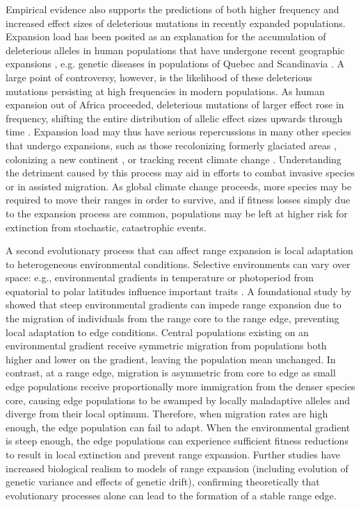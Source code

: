 Empirical evidence also supports the predictions of both higher frequency and increased effect sizes of deleterious mutations in recently expanded populations. Expansion load has been posited as an explanation for the accumulation of deleterious alleles in human populations that have undergone recent geographic expansions \citep{Karlsson:2014}, e.g. genetic diseases in populations of Quebec \citep{Labuda:1997, Scriver:2001, Yotova:2005} and Scandinavia \citep{Norio:2003}. A large point of controversy, however, is the likelihood of these deleterious mutations persisting at high frequencies in modern populations. As human expansion out of Africa proceeded, deleterious mutations of larger effect rose in frequency, shifting the entire distribution of allelic effect sizes upwards through time \citep{Henn:2015}. Expansion load may thus have serious repercussions in many other species that undergo expansions, such as those recolonizing formerly glaciated areas \citep{Hewitt:1999}, colonizing a new continent \citep{Sakai:2001}, or tracking recent climate change \citep{Chen:2011}. Understanding the detriment caused by this process may aid in efforts to combat invasive species or in assisted migration. As global climate change proceeds, more species may be required to move their ranges in order to survive, and if fitness losses simply due to the expansion process are common, populations may be left at higher risk for extinction from stochastic, catastrophic events. 

A second evolutionary process that can affect range expansion is local adaptation to heterogeneous environmental conditions. Selective environments can vary over space: e.g., environmental gradients in temperature or photoperiod from equatorial to polar latitudes influence important traits \citep{Conover:1992, Montague:2008}. A foundational study by \citet{Kirkpatrick:1997} showed that steep environmental gradients can impede range expansion due to the migration of individuals from the range core to the range edge, preventing local adaptation to edge conditions. Central populations existing on an environmental gradient receive symmetric migration from populations both higher and lower on the gradient, leaving the population mean unchanged. In contrast, at a range edge, migration is asymmetric from core to edge as small edge populations receive proportionally more immigration from the denser species core, causing edge populations to be swamped by locally maladaptive alleles and diverge from their local optimum. Therefore, when migration rates are high enough, the edge population can fail to adapt. When the environmental gradient is steep enough, the edge populations can experience sufficient fitness reductions to result in local extinction and prevent range expansion. Further studies \citep{Barton:2001, Polechova:2015} have increased biological realism to models of range expansion (including evolution of genetic variance and effects of genetic drift), confirming theoretically that evolutionary processes alone can lead to the formation of a stable range edge. 


